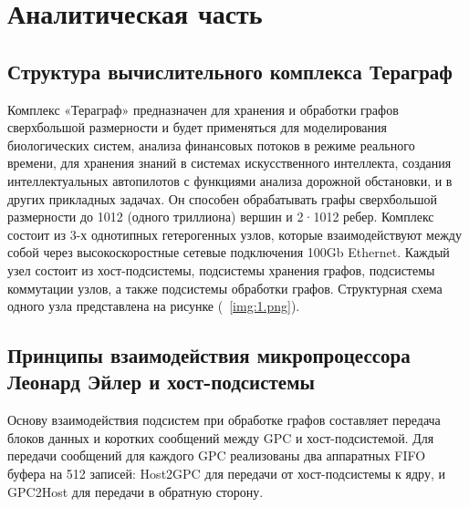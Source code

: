 \section{Аналитическая часть}

\subsection{Структура вычислительного комплекса Тераграф}
Комплекс «Тераграф» предназначен для хранения и обработки графов сверхбольшой размерности и будет применяться для моделирования биологических систем, анализа финансовых потоков в режиме реального времени, для хранения знаний в системах искусственного интеллекта, создания интеллектуальных автопилотов с функциями анализа дорожной обстановки, и в других прикладных задачах. Он способен обрабатывать графы сверхбольшой размерности до 1012 (одного триллиона) вершин и 2·1012 ребер. Комплекс состоит из 3-х однотипных гетерогенных узлов, которые взаимодействуют между собой через высокоскоростные сетевые подключения 100Gb Ethernet. Каждый узел состоит из хост-подсистемы, подсистемы хранения графов, подсистемы коммутации узлов, а также подсистемы обработки графов. Структурная схема одного узла представлена на рисунке (~\ref{img:1.png}).

\subsection{Принципы взаимодействия микропроцессора Леонард Эйлер и хост-подсистемы}
Основу взаимодействия подсистем при обработке графов составляет передача блоков данных и коротких сообщений между GPC и хост-подсистемой. Для передачи сообщений для каждого GPC реализованы два аппаратных FIFO буфера на 512 записей: Host2GPC для передачи от хост-подсистемы к ядру, и GPC2Host для передачи в обратную сторону.

